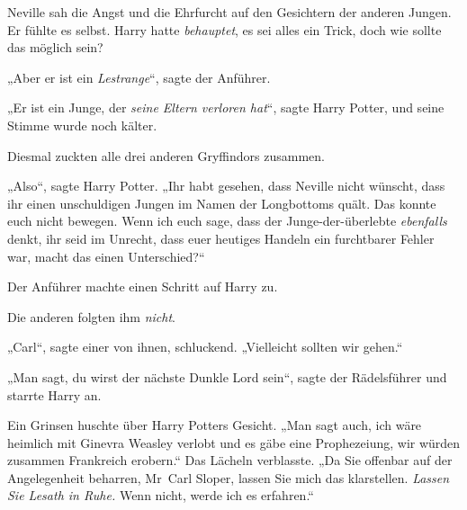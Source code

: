 Neville sah die Angst und die Ehrfurcht auf den Gesichtern der anderen Jungen. Er fühlte es selbst. Harry hatte \emph{behauptet}, es sei alles ein Trick, doch wie sollte das möglich sein?

„Aber er ist ein \emph{Lestrange}“, sagte der Anführer.

„Er ist ein Junge, der \emph{seine Eltern verloren hat}“, sagte Harry Potter, und seine Stimme wurde noch kälter.

Diesmal zuckten alle drei anderen Gryffindors zusammen.

„Also“, sagte Harry Potter.
„Ihr habt gesehen, dass Neville nicht wünscht, dass ihr einen unschuldigen Jungen im Namen der Longbottoms quält. Das konnte euch nicht bewegen. Wenn ich euch sage, dass der Junge-der-überlebte \emph{ebenfalls} denkt, ihr seid im Unrecht, dass euer heutiges Handeln ein furchtbarer Fehler war, macht das einen Unterschied?“

Der Anführer machte einen Schritt auf Harry zu.

Die anderen folgten ihm \emph{nicht}.

„Carl“, sagte einer von ihnen, schluckend.
„Vielleicht sollten wir gehen.“

„Man sagt, du wirst der nächste Dunkle Lord sein“, sagte der Rädelsführer und starrte Harry an.

Ein Grinsen huschte über Harry Potters Gesicht.
„Man sagt auch, ich wäre heimlich mit Ginevra Weasley verlobt und es gäbe eine Prophezeiung, wir würden zusammen Frankreich erobern.“ Das Lächeln verblasste.
„Da Sie offenbar auf der Angelegenheit beharren, Mr~Carl Sloper, lassen Sie mich das klarstellen. \emph{Lassen Sie Lesath in Ruhe.} Wenn nicht, werde ich es erfahren.“

